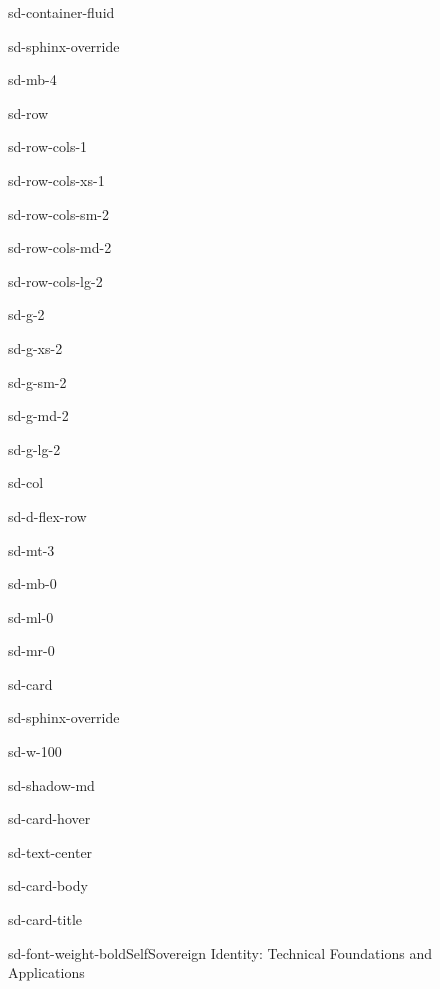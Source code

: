 \documentclass[letterpaper,10pt,english]{jupyterBook}
\begin{document}
\begin{sphinxuseclass}{sd-container-fluid}
\begin{sphinxuseclass}{sd-sphinx-override}
\begin{sphinxuseclass}{sd-mb-4}
\begin{sphinxuseclass}{sd-row}
\begin{sphinxuseclass}{sd-row-cols-1}
\begin{sphinxuseclass}{sd-row-cols-xs-1}
\begin{sphinxuseclass}{sd-row-cols-sm-2}
\begin{sphinxuseclass}{sd-row-cols-md-2}
\begin{sphinxuseclass}{sd-row-cols-lg-2}
\begin{sphinxuseclass}{sd-g-2}
\begin{sphinxuseclass}{sd-g-xs-2}
\begin{sphinxuseclass}{sd-g-sm-2}
\begin{sphinxuseclass}{sd-g-md-2}
\begin{sphinxuseclass}{sd-g-lg-2}
\begin{sphinxuseclass}{sd-col}
\begin{sphinxuseclass}{sd-d-flex-row}
\begin{sphinxuseclass}{sd-mt-3}
\begin{sphinxuseclass}{sd-mb-0}
\begin{sphinxuseclass}{sd-ml-0}
\begin{sphinxuseclass}{sd-mr-0}
\begin{sphinxuseclass}{sd-card}
\begin{sphinxuseclass}{sd-sphinx-override}
\begin{sphinxuseclass}{sd-w-100}
\begin{sphinxuseclass}{sd-shadow-md}
\begin{sphinxuseclass}{sd-card-hover}
\begin{sphinxuseclass}{sd-text-center}
\begin{sphinxuseclass}{sd-card-body}
\begin{sphinxuseclass}{sd-card-title}
\begin{sphinxuseclass}{sd-font-weight-bold}Self\sphinxhyphen{}Sovereign Identity: Technical Foundations and Applications
\end{sphinxuseclass}
\end{sphinxuseclass}




\end{sphinxuseclass}
\end{sphinxuseclass}
\end{sphinxuseclass}
\end{sphinxuseclass}
\end{sphinxuseclass}
\end{sphinxuseclass}
\end{sphinxuseclass}
\end{sphinxuseclass}
\end{sphinxuseclass}
\end{sphinxuseclass}
\end{sphinxuseclass}
\end{sphinxuseclass}
\end{sphinxuseclass}
\end{sphinxuseclass}
\end{sphinxuseclass}
\end{sphinxuseclass}
\end{sphinxuseclass}
\end{sphinxuseclass}
\end{sphinxuseclass}
\end{sphinxuseclass}
\end{sphinxuseclass}
\end{sphinxuseclass}
\end{sphinxuseclass}
\end{sphinxuseclass}
\end{sphinxuseclass}
\end{sphinxuseclass}
\end{sphinxuseclass}
\sphinxstepscope
\end{document}
